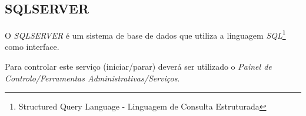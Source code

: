 \subsection{SQLSERVER}

O \emph{SQLSERVER} é um sistema de base de dados que utiliza a linguagem \emph{SQL}\footnote{Structured Query Language - Linguagem de Consulta Estruturada} como interface.

Para controlar este serviço (iniciar/parar) deverá ser utilizado o \emph{Painel de Controlo/Ferramentas Administrativas/Serviços}.
